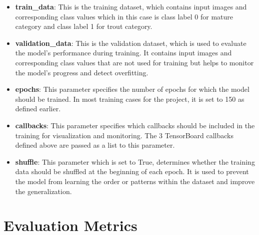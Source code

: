 \begin{itemize}
    \item \textbf{train\_data}: This is the training dataset, which contains input images and corresponding class values which in this case is class label 0 for mature category and class label 1 for trout category.
    \item \textbf{validation\_data}: This is the validation dataset, which is used to evaluate the model's performance during training. It contains input images and corresponding class values that are not used for training but helps to monitor the model's progress and detect overfitting.
    \item \textbf{epochs}: This parameter specifies the number of epochs for which the model should be trained. In most training cases for the project, it is set to 150 as defined earlier.
    \item \textbf{callbacks}: This parameter specifies which callbacks should be included in the training for visualization and monitoring. The 3 TensorBoard callbacks defined above are passed as a list to this parameter.
    \item \textbf{shuffle}: This parameter which is set to True, determines whether the training data should be shuffled at the beginning of each epoch. It is used to prevent the model from learning the order or patterns within the dataset and improve the generalization.
\end{itemize}

\section{Evaluation Metrics}


